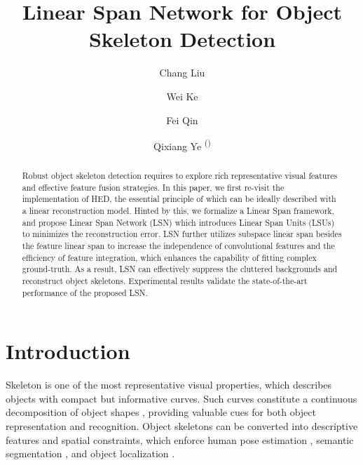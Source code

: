 \documentclass[runningheads]{llncs}
\begin{document}
\title{Linear Span Network for Object Skeleton Detection} 


\author{Chang Liu\inst{*}  \and
Wei Ke\inst{*} \and
Fei Qin \and
Qixiang Ye \textsuperscript{(\Letter)}}
 \maketitle   %
\begin{abstract}
Robust object skeleton detection requires to explore rich representative visual features and effective feature fusion strategies. In this paper, we first re-visit the implementation of HED, the essential principle of which can be ideally described with a linear reconstruction model. Hinted by this, we formalize a Linear Span framework, and propose Linear Span Network (LSN) which introduces Linear Span Units (LSUs) to minimizes the reconstruction error. LSN further utilizes subspace linear span besides the feature linear span to increase the independence of convolutional features and the efficiency of feature integration, which enhances the capability of fitting complex ground-truth. As a result, LSN can effectively suppress the cluttered backgrounds and reconstruct object skeletons. Experimental results validate the state-of-the-art performance of the proposed LSN.{\let\thefootnote\relax{}}
{\let\thefootnote\relax{}}


\end{abstract}
\section{Introduction}

Skeleton is one of the most representative visual properties, which describes objects with compact but informative curves. Such curves constitute a continuous decomposition of object shapes \cite{ref31}, providing valuable cues for both object representation and recognition. Object skeletons can be converted into descriptive features and spatial constraints, which enforce human pose estimation \cite{ref4}, semantic segmentation \cite{ref16}, and object localization \cite{ref32}. 
\end{document}
